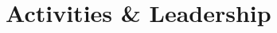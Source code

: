\documentclass[a4paper,10pt]{extarticle} %
\begin{document}


\vspace{-0.5cm}
\section{\textcolor{primary}{Activities \& Leadership}}
\end{document}
